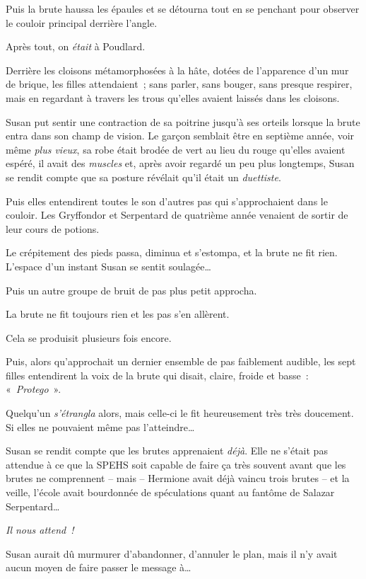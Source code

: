 Puis la brute haussa les épaules et se détourna tout en se penchant pour observer le couloir principal derrière l'angle.

Après tout, on \emph{était} à Poudlard.

Derrière les cloisons métamorphosées à la hâte, dotées de l'apparence d'un mur de brique, les filles attendaient~; sans parler, sans bouger, sans presque respirer, mais en regardant à travers les trous qu'elles avaient laissés dans les cloisons.

Susan put sentir une contraction de sa poitrine jusqu'à ses orteils lorsque la brute entra dans son champ de vision. Le garçon semblait être en septième année, voir même \emph{plus vieux}, sa robe était brodée de vert au lieu du rouge qu'elles avaient espéré, il avait des \emph{muscles} et, après avoir regardé un peu plus longtemps, Susan se rendit compte que sa posture révélait qu'il était un \emph{duettiste}.

Puis elles entendirent toutes le son d'autres pas qui s'approchaient dans le couloir. Les Gryffondor et Serpentard de quatrième année venaient de sortir de leur cours de potions.

Le crépitement des pieds passa, diminua et s'estompa, et la brute ne fit rien. L'espace d'un instant Susan se sentit soulagée…

Puis un autre groupe de bruit de pas plus petit approcha.

La brute ne fit toujours rien et les pas s'en allèrent.

Cela se produisit plusieurs fois encore.

Puis, alors qu'approchait un dernier ensemble de pas faiblement audible, les sept filles entendirent la voix de la brute qui disait, claire, froide et basse~: «~\emph{Protego}~».

Quelqu'un \emph{s'étrangla} alors, mais celle-ci le fit heureusement très très doucement. Si elles ne pouvaient même pas l'atteindre…

Susan se rendit compte que les brutes apprenaient \emph{déjà}. Elle ne s'était pas attendue à ce que la SPEHS soit capable de faire ça très souvent avant que les brutes ne comprennent -- mais -- Hermione avait déjà vaincu trois brutes -- et la veille, l'école avait bourdonnée de spéculations quant au fantôme de Salazar Serpentard…

\emph{Il nous attend~!}

Susan aurait dû murmurer d'abandonner, d'annuler le plan, mais il n'y avait aucun moyen de faire passer le message à…

